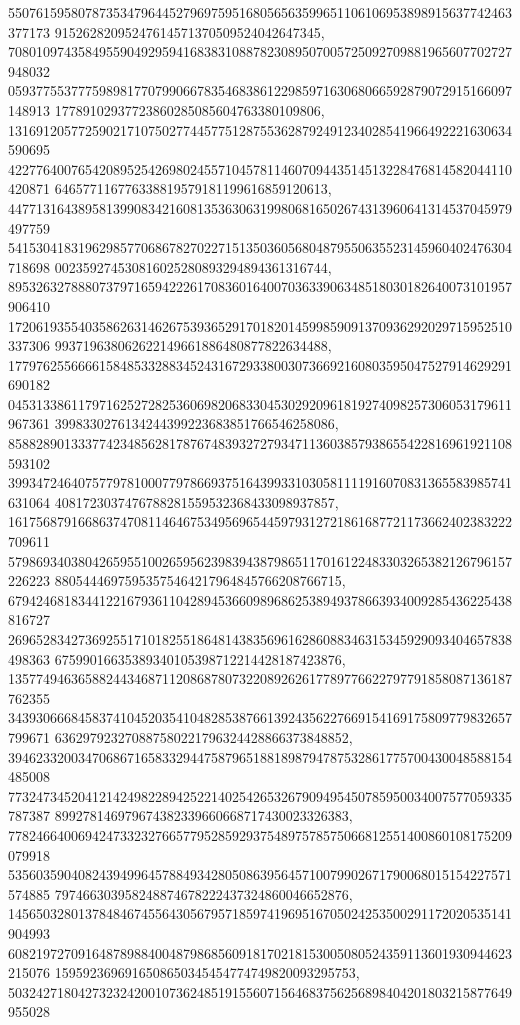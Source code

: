 \documentclass[12pt]{article}
\begin{document}
550761595807873534796445279697595168056563599651106106953898915637742463377173
91526282095247614571370509524042647345, 
708010974358495590492959416838310887823089507005725092709881965607702727948032
059377553777598981770799066783546838612298597163068066592879072915166097148913
17789102937723860285085604763380109806, 
131691205772590217107502774457751287553628792491234028541966492221630634590695
422776400765420895254269802455710457811460709443514513228476814582044110420871
646577116776338819579181199616859120613, 
447713164389581399083421608135363063199806816502674313960641314537045979497759
541530418319629857706867827022715135036056804879550635523145960402476304718698
002359274530816025280893294894361316744, 
895326327888073797165942226170836016400703633906348518030182640073101957906410
172061935540358626314626753936529170182014599859091370936292029715952510337306
993719638062622149661886480877822634488, 
177976255666615848533288345243167293380030736692160803595047527914629291690182
045313386117971625272825360698206833045302920961819274098257306053179611967361
3998330276134244399223683851766546258086, 
858828901333774234856281787674839327279347113603857938655422816961921108593102
399347246407577978100077978669375164399331030581111916070831365583985741631064
4081723037476788281559532368433098937857, 
161756879166863747081146467534956965445979312721861687721173662402383222709611
579869340380426595510026595623983943879865117016122483303265382126796157226223
88054446975953575464217964845766208766715, 
679424681834412216793611042894536609896862538949378663934009285436225438816727
269652834273692551710182551864814383569616286088346315345929093404657838498363
67599016635389340105398712214428187423876, 
135774946365882443468711208687807322089262617789776622797791858087136187762355
343930666845837410452035410482853876613924356227669154169175809779832657799671
636297923270887580221796324428866373848852, 
394623320034706867165833294475879651881898794787532861775700430048588154485008
773247345204121424982289425221402542653267909495450785950034007577059335787387
899278146979674382339660668717430023326383, 
778246640069424733232766577952859293754897578575066812551400860108175209079918
535603590408243949964578849342805086395645710079902671790068015154227571574885
797466303958248874678222437324860046652876, 
145650328013784846745564305679571859741969516705024253500291172020535141904993
608219727091648789884004879868560918170218153005080524359113601930944623215076
1595923696916508650345454774749820093295753, 
503242718042732324200107362485191556071564683756256898404201803215877649955028
\end{document}
